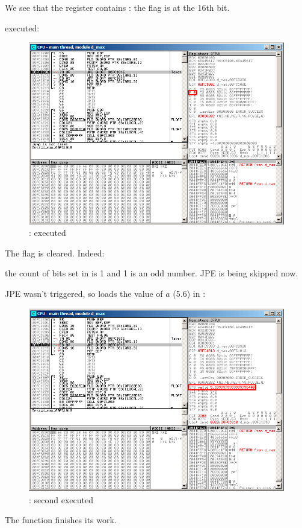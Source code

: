 We see that the  register contains : the \Czero flag is at the 16th bit.

\clearpage
\TEST executed:

\begin{figure}[H]
\centering
\includegraphics[scale=\FigScale]{patterns/12_FPU/3_comparison/x86/MSVC/olly2_4.png}
\caption{\olly: \TEST executed}
\label{fig:FPU_comparison_case2_olly4}
\end{figure}

The   flag is cleared.
Indeed: 

the count of bits set in  is 1 and 1 is an odd number.
\ac{JPE} is being skipped now.

\clearpage
\ac{JPE} wasn't triggered, so \FLD loads the value of $a$ (5.6) in :

\begin{figure}[H]
\centering
\includegraphics[scale=\FigScale]{patterns/12_FPU/3_comparison/x86/MSVC/olly2_5.png}
\caption{\olly: second \FLD executed}
\label{fig:FPU_comparison_case2_olly5}
\end{figure}

The function finishes its work.
